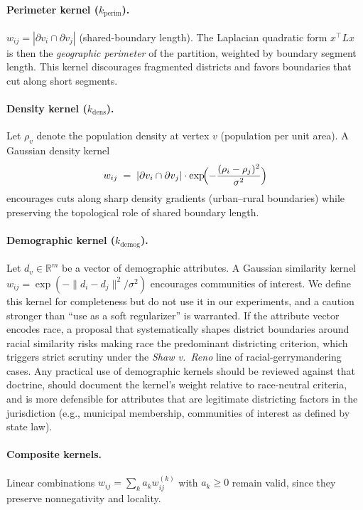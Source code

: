 \documentclass[11pt]{article}
\newcommand{\R}{\mathbb{R}}
\begin{document}
\paragraph{Perimeter kernel ($k_{\mathrm{perim}}$).} $w_{ij} = |\partial v_i \cap \partial v_j|$
(shared-boundary length). The Laplacian quadratic form $x^\top L x$
is then the \emph{geographic perimeter} of the partition, weighted by
boundary segment length. This kernel discourages fragmented districts
and favors boundaries that cut along short segments.

\paragraph{Density kernel ($k_{\mathrm{dens}}$).} Let $\rho_v$ denote
the population density at vertex $v$ (population per unit area). A
Gaussian density kernel
\[
  w_{ij} \;=\; |\partial v_i \cap \partial v_j| \cdot
  \exp\!\Bigl( -\frac{(\rho_i - \rho_j)^2}{\sigma^2} \Bigr)
\]
encourages cuts along sharp density gradients (urban--rural
boundaries) while preserving the topological role of shared boundary
length.

\paragraph{Demographic kernel ($k_{\mathrm{demog}}$).} Let
$d_v \in \R^m$ be a vector of demographic attributes. A Gaussian
similarity kernel $w_{ij} = \exp(-\|d_i - d_j\|^2 / \sigma^2)$
encourages communities of interest. We define this kernel for
completeness but do not use it in our experiments, and a caution
stronger than ``use as a soft regularizer'' is warranted. If the
attribute vector encodes race, a proposal that systematically shapes
district boundaries around racial similarity risks making race the
predominant districting criterion, which triggers strict scrutiny
under the \emph{Shaw v.\ Reno} line of racial-gerrymandering cases.
Any practical use of demographic kernels should be reviewed against
that doctrine, should document the kernel's weight relative to
race-neutral criteria, and is more defensible for attributes that are
legitimate districting factors in the jurisdiction (e.g., municipal
membership, communities of interest as defined by state law).

\paragraph{Composite kernels.} Linear combinations $w_{ij} = \sum_k a_k w_{ij}^{(k)}$
with $a_k \ge 0$ remain valid, since they preserve nonnegativity and locality.
\end{document}
